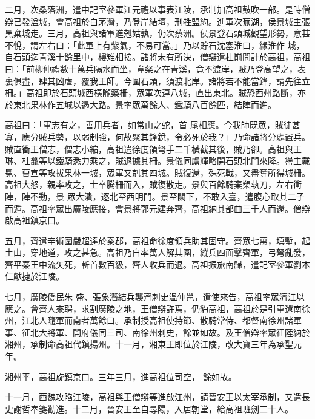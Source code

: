 \begin{pinyinscope}
 二月，次桑落洲，遣中記室參軍江元禮以事表江陵，承制加高祖鼓吹一部。是時僧辯已發湓城，會高祖於白茅灣，乃登岸結壇，刑牲盟約。進軍次蕪湖，侯景城主張黑棄城走。三月，高祖與諸軍進剋姑孰，仍次蔡洲。侯景登石頭城觀望形勢，意甚不悅，謂左右曰：「此軍上有紫氣，不易可當。」乃以貯石沈塞淮口，緣淮作
 城，自石頭迄青溪十餘里中，樓雉相接。諸將未有所決，僧辯遣杜崱問計於高祖，高祖曰：「前柳仲禮數十萬兵隔水而坐，韋粲之在青溪，竟不渡岸，賊乃登高望之，表裏俱盡，肆其凶虐，覆我王師。今圍石頭，須渡北岸。諸將若不能當鋒，請先往立柵。」高祖即於石頭城西橫隴築柵，眾軍次連八城，直出東北。賊恐西州路斷，亦於東北果林作五城以遏大路。景率眾萬餘人、鐵騎八百餘匹，結陣而進。



 高祖曰：「軍志有之，善用兵者，如常山之蛇，首
 尾相應。今我師既眾，賊徒甚寡，應分賊兵勢，以弱制強，何故聚其鋒銳，令必死於我？」乃命諸將分處置兵。賊直衝王僧志，僧志小縮，高祖遣徐度領弩手二千橫截其後，賊乃卻。高祖與王琳、杜龕等以鐵騎悉力乘之，賊退據其柵。景儀同盧輝略開石頭北門來降。盪主戴冕、曹宣等攻拔果林一城，眾軍又剋其四城。賊復還，殊死戰，又盡奪所得城柵。高祖大怒，親率攻之，士卒騰柵而入，賊復散走。景與百餘騎棄槊執刀，左右衝陣，陣不動，景
 眾大潰，逐北至西明門。景至闕下，不敢入臺，遣腹心取其二子而遁。高祖率眾出廣陵應接，會景將郭元建奔齊，高祖納其部曲三千人而還。僧辯啟高祖鎮京口。



 五月，齊遣辛術圍嚴超達於秦郡，高祖命徐度領兵助其固守。齊眾七萬，填塹，起土山，穿地道，攻之甚急。高祖乃自率萬人解其圍，縱兵四面擊齊軍，弓弩亂發，齊平秦王中流矢死，斬首數百級，齊人收兵而退。高祖振旅南歸，遣記室參軍劉本仁獻捷於江陵。



 七月，廣陵僑民朱
 盛、張象潛結兵襲齊刺史溫仲邕，遣使來告，高祖率眾濟江以應之。會齊人來聘，求割廣陵之地，王僧辯許焉，仍豹高祖，高祖於是引軍還南徐州，江北人隨軍而南者萬餘口。承制授高祖使持節、散騎常侍、都督南徐州諸軍事、征北大將軍、開府儀同三司、南徐州刺史，餘並如故。及王僧辯率眾征陸納於湘州，承制命高祖代鎮揚州。十一月，湘東王即位於江陵，改大寶三年為承聖元年。



 湘州平，高祖旋鎮京口。三年三月，進高祖位司空，
 餘如故。



 十一月，西魏攻陷江陵，高祖與王僧辯等進啟江州，請晉安王以太宰承制，又遣長史謝哲奉箋勸進。十二月，晉安王至自尋陽，入居朝堂，給高祖班劍二十人。




\end{pinyinscope}
